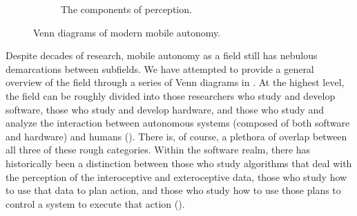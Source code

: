 \begin{figure}
\begin{subfigure}[b]{0.3\textwidth}
        \caption{The components of perception.}
         \label{fig:intro_perception_venn}
 \end{subfigure}
        \caption{Venn diagrams of modern mobile autonomy.}
        \label{fig:intro_three_venn}
\end{figure}

 
 Despite decades of research, mobile autonomy as a field still has nebulous demarcations between subfields. We have attempted to provide a general overview of the field through a series of Venn diagrams in .  At the highest level, the field can be roughly divided into those researchers who study and develop software, those who study and develop hardware, and those who study and analyze the interaction between autonomous systems (composed of both software and hardware) and humans (). There is, of course, a plethora of overlap between all three of these rough categories. Within the software realm, there has historically been a distinction between those who study algorithms that deal with the perception of the interoceptive and exteroceptive data, those who study how to use that data to plan action, and those who study how to use those plans to control a system to execute that action (). 
 
 
